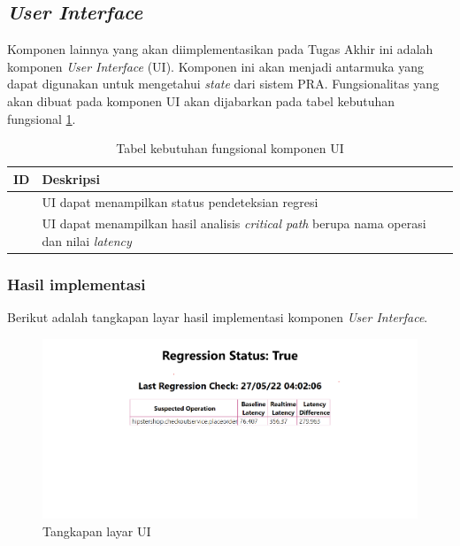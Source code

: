 \subsection{\textit{User Interface}}
Komponen lainnya yang akan diimplementasikan pada Tugas Akhir ini adalah komponen \textit{User Interface} (UI). Komponen ini akan menjadi antarmuka yang dapat digunakan untuk mengetahui \textit{state} dari sistem PRA. Fungsionalitas yang akan dibuat pada komponen UI akan dijabarkan pada tabel kebutuhan  fungsional \ref{ui-functional}.
\begin{small}
	\begin{longtable}{ | p{3cm} | p{9cm} | }
		\caption{Tabel kebutuhan fungsional komponen UI}
		\label{ui-functional}                                                           
		\\ \hline
		\centering\bfseries{ID} & \centering\bfseries{Deskripsi} \tabularnewline \hline
		\endfirsthead
		\centering{UI-1} & UI dapat menampilkan status pendeteksian regresi  \\ \hline
		\centering{UI-2} & UI dapat menampilkan hasil analisis \textit{critical path} berupa nama operasi dan nilai \textit{latency} \\ \hline

	\end{longtable}
\end{small}

\subsubsection{Hasil implementasi}
Berikut adalah tangkapan layar hasil implementasi komponen \textit{User Interface}.

\begin{figure}[!htb]
	\centering
	\includegraphics[width=1\textwidth]{resources/ch4/ui.png}
	\caption{Tangkapan layar UI}
	\label{ui}
\end{figure}

